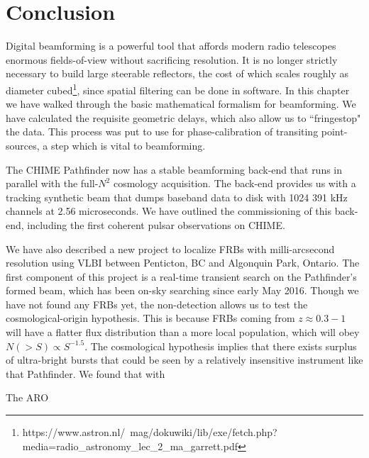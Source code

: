 \section{Conclusion}
\label{sec:beamforming_conclusion}

Digital beamforming is a powerful tool that affords modern 
radio telescopes enormous fields-of-view without 
sacrificing resolution. It is no longer strictly necessary 
to build large steerable reflectors, the cost of which scales 
roughly as diameter cubed\footnote{https://www.astron.nl/~mag/dokuwiki/lib/exe/fetch.php?media=radio\_astronomy\_lec\_2\_ma\_garrett.pdf}, 
since spatial filtering can be done in software.
In this chapter 
we have walked through the basic mathematical formalism 
for beamforming. We have calculated the requisite geometric 
delays, which also allow us to ``fringestop" the data. 
This process was 
put to use for phase-calibration of transiting point-sources, 
a step which is vital to beamforming. 

The CHIME Pathfinder now has a stable beamforming back-end
that runs in parallel with the full-$N^2$ cosmology acquisition.
The back-end provides us with a tracking synthetic beam that 
dumps baseband data to disk with 1024 391 kHz channels at 
2.56 microseconds. We have outlined the commissioning of this 
back-end, including the first coherent pulsar observations on CHIME.

We have also described a new project to localize FRBs with 
milli-arcsecond resolution using VLBI between Penticton, BC 
and Algonquin Park, Ontario. The first component 
of this project is a real-time transient search on the Pathfinder's 
formed beam, which has been on-sky searching since early May 2016. 
Though we have not found any FRBs yet, the non-detection 
allows us to test the cosmological-origin hypothesis. This is 
because FRBs coming from $z\approx0.3-1$ will have a flatter 
flux distribution than a more local population, which 
will obey $N(>S)\propto S^{-1.5}$. The cosmological hypothesis implies that 
there exists surplus of ultra-bright bursts that could be 
seen by a relatively insensitive instrument like that Pathfinder.
We found that with 

The ARO 




  
